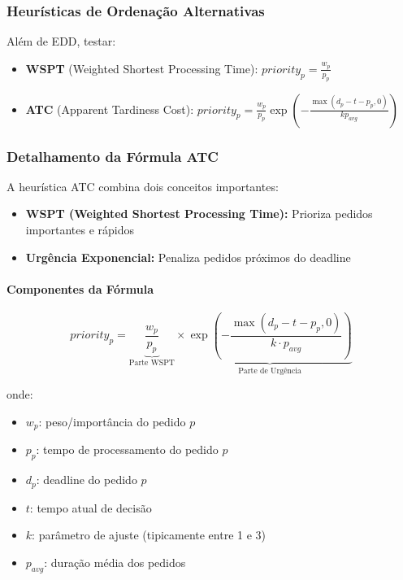 \documentclass[11pt,a4paper]{article}
\begin{document}
\subsubsection{Heurísticas de Ordenação Alternativas}

Além de EDD, testar:
\begin{itemize}
    \item \textbf{WSPT} (Weighted Shortest Processing Time): $priority_p = \frac{w_p}{p_p}$
    \item \textbf{ATC} (Apparent Tardiness Cost): $priority_p = \frac{w_p}{p_p} \exp\left(-\frac{\max(d_p - t - p_p, 0)}{k p_{avg}}\right)$
\end{itemize}
\subsubsection{Detalhamento da Fórmula ATC}

A heurística ATC combina dois conceitos importantes:

\begin{itemize}
    \item \textbf{WSPT (Weighted Shortest Processing Time):} Prioriza pedidos importantes e rápidos
    \item \textbf{Urgência Exponencial:} Penaliza pedidos próximos do deadline
\end{itemize}

\paragraph{Componentes da Fórmula}

\begin{equation}
priority_p = \underbrace{\frac{w_p}{p_p}}_{\text{Parte WSPT}} \times \underbrace{\exp\left(-\frac{\max(d_p - t - p_p, 0)}{k \cdot p_{avg}}\right)}_{\text{Parte de Urgência}}
\end{equation}

onde:
\begin{itemize}
    \item $w_p$: peso/importância do pedido $p$
    \item $p_p$: tempo de processamento do pedido $p$
    \item $d_p$: deadline do pedido $p$
    \item $t$: tempo atual de decisão
    \item $k$: parâmetro de ajuste (tipicamente entre 1 e 3)
    \item $p_{avg}$: duração média dos pedidos
\end{itemize}
\end{document}
